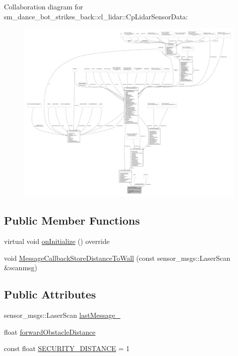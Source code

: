Collaboration diagram for sm\+\_\+dance\+\_\+bot\+\_\+strikes\+\_\+back\+:\+:cl\+\_\+lidar\+:\+:Cp\+Lidar\+Sensor\+Data\+:
\nopagebreak
\begin{figure}[H]
\begin{center}
\leavevmode
\includegraphics[width=350pt]{classsm__dance__bot__strikes__back_1_1cl__lidar_1_1CpLidarSensorData__coll__graph}
\end{center}
\end{figure}
\subsection*{Public Member Functions}
\begin{DoxyCompactItemize}
\item 
virtual void \hyperlink{classsm__dance__bot__strikes__back_1_1cl__lidar_1_1CpLidarSensorData_a138dad9a855d5d4962410374d0a29d30}{on\+Initialize} () override
\item 
void \hyperlink{classsm__dance__bot__strikes__back_1_1cl__lidar_1_1CpLidarSensorData_aefe481c1441305a6adf5266c49d941a4}{Message\+Callback\+Store\+Distance\+To\+Wall} (const sensor\+\_\+msgs\+::\+Laser\+Scan \&scanmsg)
\end{DoxyCompactItemize}
\subsection*{Public Attributes}
\begin{DoxyCompactItemize}
\item 
sensor\+\_\+msgs\+::\+Laser\+Scan \hyperlink{classsm__dance__bot__strikes__back_1_1cl__lidar_1_1CpLidarSensorData_a8a84fbb0a3f35a7fc040b266d33075ec}{last\+Message\+\_\+}
\item 
float \hyperlink{classsm__dance__bot__strikes__back_1_1cl__lidar_1_1CpLidarSensorData_a40d6ddeab582ec69477622e3c060b210}{forward\+Obstacle\+Distance}
\item 
const float \hyperlink{classsm__dance__bot__strikes__back_1_1cl__lidar_1_1CpLidarSensorData_aa83f62091b2455323340a87e8636df60}{S\+E\+C\+U\+R\+I\+T\+Y\+\_\+\+D\+I\+S\+T\+A\+N\+CE} = 1
\end{DoxyCompactItemize}
